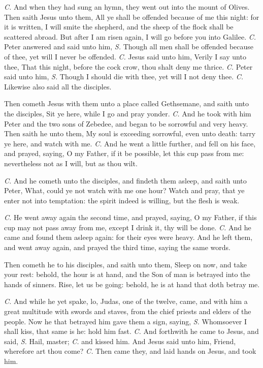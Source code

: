 \textit{C.} And when they had sung an hymn, they went out into the mount of Olives. Then saith Jesus unto them, {} All ye shall be offended because of me this night: for it is written, I will smite the shepherd, and the sheep of the flock shall be scattered abroad. But after I am risen again, I will go before you into Galilee. \textit{C.} Peter answered and said unto him, \textit{S.} Though all men shall be offended because of thee, yet will I never be offended. \textit{C.} Jesus said unto him, {} Verily I say unto thee, That this night, before the cock crow, thou shalt deny me thrice. \textit{C.} Peter said unto him, \textit{S.} Though I should die with thee, yet will I not deny thee. \textit{C.} Likewise also said all the disciples.

Then cometh Jesus with them unto a place called Gethsemane, and saith unto the disciples, {} Sit ye here, while I go and pray yonder. \textit{C.} And he took with him Peter and the two sons of Zebedee, and began to be sorrowful and very heavy. Then saith he unto them, {} My soul is exceeding sorrowful, even unto death: tarry ye here, and watch with me. \textit{C.} And he went a little further, and fell on his face, and prayed, saying, {} O my Father, if it be possible, let this cup pass from me: nevertheless not as I will, but as thou wilt.

\textit{C.} And he cometh unto the disciples, and findeth them asleep, and saith unto Peter, {} What, could ye not watch with me one hour? Watch and pray, that ye enter not into temptation: the spirit indeed is willing, but the flesh is weak.

\textit{C.} He went away again the second time, and prayed, saying, {} O my Father, if this cup may not pass away from me, except I drink it, thy will be done. \textit{C.} And he came and found them asleep again: for their eyes were heavy. And he left them, and went away again, and prayed the third time, saying the same words.

Then cometh he to his disciples, and saith unto them, {} Sleep on now, and take your rest: behold, the hour is at hand, and the Son of man is betrayed into the hands of sinners. Rise, let us be going: behold, he is at hand that doth betray me.

\textit{C.} And while he yet spake, lo, Judas, one of the twelve, came, and with him a great multitude with swords and staves, from the chief priests and elders of the people. Now he that betrayed him gave them a sign, saying, \textit{S.} Whomsoever I shall kiss, that same is he: hold him fast. \textit{C.} And forthwith he came to Jesus, and said, \textit{S.} Hail, master; \textit{C.} and kissed him. And Jesus said unto him, {} Friend, wherefore art thou come? \textit{C.} Then came they, and laid hands on Jesus, and took him.

